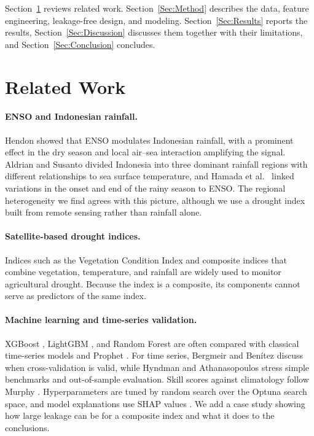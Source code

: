 \documentclass[11pt,twoside]{article}
\begin{document}
Section~\ref{Sec:Related} reviews related work. Section~\ref{Sec:Method} describes the data, feature engineering, leakage-free design, and modeling. Section~\ref{Sec:Results} reports the results, Section~\ref{Sec:Discussion} discusses them together with their limitations, and Section~\ref{Sec:Conclusion} concludes.

\section{Related Work}
\label{Sec:Related}

\paragraph{ENSO and Indonesian rainfall.} Hendon \cite{hendon2003indonesian} showed that ENSO modulates Indonesian rainfall, with a prominent effect in the dry season and local air--sea interaction amplifying the signal. Aldrian and Susanto \cite{aldrian2003rainfall} divided Indonesia into three dominant rainfall regions with different relationships to sea surface temperature, and Hamada et al.\ \cite{hamada2002rainy} linked variations in the onset and end of the rainy season to ENSO. The regional heterogeneity we find agrees with this picture, although we use a drought index built from remote sensing rather than rainfall alone.

\paragraph{Satellite-based drought indices.} Indices such as the Vegetation Condition Index \cite{kogan1995vci} and composite indices that combine vegetation, temperature, and rainfall \cite{rhee2010sdci} are widely used to monitor agricultural drought. Because the index is a composite, its components cannot serve as predictors of the same index.

\paragraph{Machine learning and time-series validation.} XGBoost \cite{chen2016xgboost}, LightGBM \cite{ke2017lightgbm}, and Random Forest \cite{breiman2001rf} are often compared with classical time-series models and Prophet \cite{taylor2018prophet}. For time series, Bergmeir and Ben\'itez \cite{bergmeir2012cv} discuss when cross-validation is valid, while Hyndman and Athanasopoulos \cite{hyndman2021fpp3} stress simple benchmarks and out-of-sample evaluation. Skill scores against climatology follow Murphy \cite{murphy1988skill}. Hyperparameters are tuned by random search over the Optuna \cite{akiba2019optuna} search space, and model explanations use SHAP values \cite{lundberg2017shap}. We add a case study showing how large leakage can be for a composite index and what it does to the conclusions.
\end{document}
